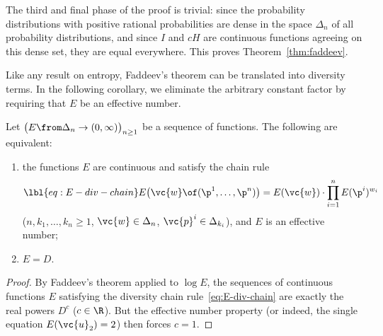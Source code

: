 The third and final phase of the proof is trivial: since the probability
distributions with positive rational probabilities are dense in the space
$\Delta_n$ of all probability distributions, and since $I$ and $cH$
are continuous functions agreeing on this dense set, they are equal
everywhere.  This proves Theorem~\ref{thm:faddeev}.

Like any result on entropy, Faddeev's theorem can be translated into
diversity terms.  In the following corollary, we eliminate the arbitrary
constant factor by requiring that $E$ be an effective number.  

\begin{cor}
Let $\bigl( E \from \Delta_n \to (0, \infty) \bigr)_{n \geq 1}$ be a
sequence of functions.  The following are equivalent:
% 
\begin{enumerate}
\item 
{}
the functions $E$ are continuous and satisfy the chain rule
% 
\begin{equation}
\lbl{eq:E-div-chain}
E\bigl(\vc{w} \of (\p^1, \ldots, \p^n)\bigr)
=
E(\vc{w}) \cdot \prod_{i = 1}^n E(\p^i)^{w_i}
\end{equation}
% 
($n, k_1, \ldots, k_n \geq 1$, $\vc{w} \in \Delta_n$, $\vc{p}^i \in
\Delta_{k_i}$), and $E$ is an effective number;

\item
{}
$E = D$.
\end{enumerate}
\end{cor}

\begin{proof}
By Faddeev's theorem applied to $\log E$, the sequences of continuous
functions $E$ satisfying the diversity chain rule~\eqref{eq:E-div-chain}
are exactly the real powers $D^c$ ($c \in \R$).  But the effective number
property (or indeed, the single equation $E(\vc{u}_2) = 2$) then forces $c
= 1$.
\end{proof}

